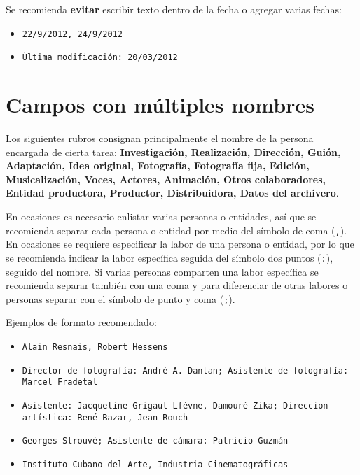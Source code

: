 \documentclass[10pt,letterpaper]{article}
\begin{document}
Se recomienda \textbf{evitar} escribir texto dentro de la fecha o agregar varias fechas:
{\color{Red}
\begin{itemize}
	\item \texttt{22/9/2012, 24/9/2012}
	\item \texttt{Última modificación: 20/03/2012}
\end{itemize}
}

\section{Campos con múltiples nombres}
Los siguientes rubros consignan principalmente el nombre de la persona encargada de cierta tarea: \textbf{Investigación, Realización, Dirección, Guión, Adaptación, Idea original, Fotografía, Fotografía fija, Edición, Musicalización, Voces, Actores, Animación, Otros colaboradores, Entidad productora, Productor, Distribuidora, Datos del archivero}. 

En ocasiones es necesario enlistar varias personas o entidades, así que se recomienda separar cada persona o entidad por medio del símbolo de coma (\verb|,|). En ocasiones se requiere especificar la labor de una persona o entidad, por lo que se recomienda indicar la labor específica seguida del símbolo dos puntos (\verb|:|), seguido del nombre. Si varias personas comparten una labor específica se recomienda separar también con una coma y para diferenciar de otras labores o personas separar con el símbolo de punto y coma (\verb|;|). 

Ejemplos de formato recomendado:
{\color{Blue}
\begin{itemize}
	\item \texttt{Alain Resnais, Robert Hessens}
	\item \texttt{Director de fotografía: André A. Dantan; Asistente de fotografía: Marcel Fradetal}
	\item \texttt{Asistente: Jacqueline Grigaut-Lfévne, Damouré Zika; Direccion artística: René Bazar, Jean Rouch}
	\item \texttt{Georges Strouvé; Asistente de cámara: Patricio Guzmán}
	\item \texttt{Instituto Cubano del Arte, Industria Cinematográficas}
\end{itemize}
}
\end{document}
